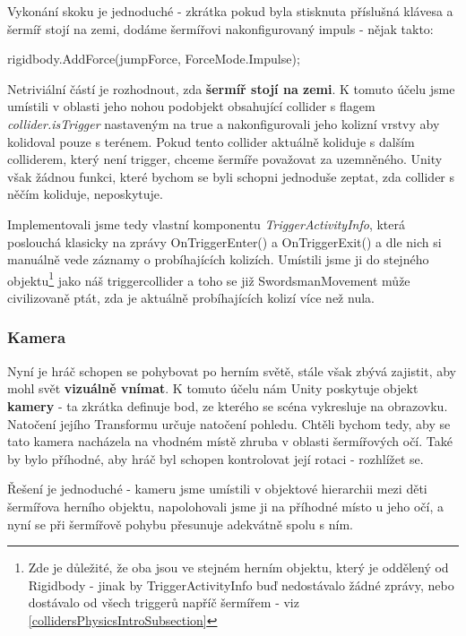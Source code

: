 Vykonání skoku je jednoduché - zkrátka pokud byla stisknuta příslušná klávesa a šermíř stojí na zemi, dodáme šermířovi nakonfigurovaný impuls - nějak takto:

\begin{code}
 rigidbody.AddForce(jumpForce, ForceMode.Impulse);
\end{code}

Netriviální částí je rozhodnout, zda \textbf{šermíř stojí na zemi}. K tomuto účelu jsme umístili v oblasti jeho nohou podobjekt obsahující collider s flagem \textit{collider.isTrigger} nastaveným na true a nakonfigurovali jeho kolizní vrstvy aby kolidoval pouze s terénem. Pokud tento collider aktuálně koliduje s dalším colliderem, který není trigger, chceme šermíře považovat za uzemněného. Unity však žádnou funkci, které bychom se byli schopni jednoduše zeptat, zda collider s něčím koliduje, neposkytuje. 

Implementovali jsme tedy vlastní komponentu \textit{TriggerActivityInfo}, která poslouchá klasicky na zprávy OnTriggerEnter() a OnTriggerExit() a dle nich si manuálně vede záznamy o probíhajících kolizích. Umístili jsme ji do stejného objektu\footnote{Zde je důležité, že oba jsou ve stejném herním objektu, který je oddělený od Rigidbody - jinak by TriggerActivityInfo buď nedostávalo žádné zprávy, nebo dostávalo od všech triggerů napříč šermířem - viz \ref{collidersPhysicsIntroSubsection}} jako náš triggercollider a toho se již SwordsmanMovement může civilizovaně ptát, zda je aktuálně probíhajících kolizí více než nula.

\subsubsection*{Kamera}

Nyní je hráč schopen se pohybovat po herním světě, stále však zbývá zajistit, aby mohl svět \textbf{vizuálně vnímat}. K tomuto účelu nám Unity poskytuje objekt \textbf{kamery} - ta zkrátka definuje bod, ze kterého se scéna vykresluje na obrazovku. Natočení jejího Transformu určuje natočení pohledu. Chtěli bychom tedy, aby se tato kamera nacházela na vhodném místě zhruba v oblasti šermířových očí. Také by bylo příhodné, aby hráč byl schopen kontrolovat její rotaci - rozhlížet se.

Řešení je jednoduché - kameru jsme umístili v objektové hierarchii mezi děti šermířova herního objektu, napolohovali jsme ji na příhodné místo u jeho očí, a nyní se při šermířově pohybu přesunuje adekvátně spolu s ním. 

